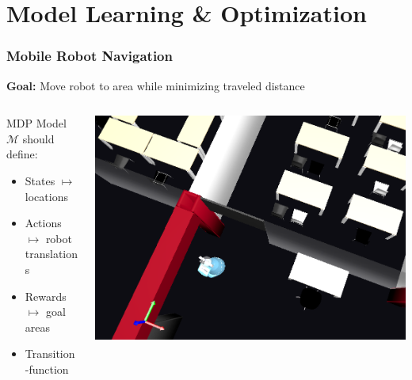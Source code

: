 \section{Model Learning \& Optimization}

\begin{frame}
\frametitle{Mobile Robot Navigation}
\textcolor{tudblue}{\textbf{Goal:}} Move robot to area while minimizing traveled distance
\vfill

\begin{columns}[T]
\begin{column}{0.5\textwidth}
MDP Model $\mathcal{M}$ should define:
\begin{itemize}
	\item States \hspace{12.75pt}$\mapsto$ locations
	\item Actions \hspace{7.5pt}$\mapsto$ robot translations
	\item Rewards $\mapsto$ goal areas
	\item Transition-function
\end{itemize}

\end{column}

\begin{column}{0.425\textwidth}
\includegraphics[width=\textwidth]{figures/simulator_6_crop}
\end{column}

\end{columns}

\end{frame}

